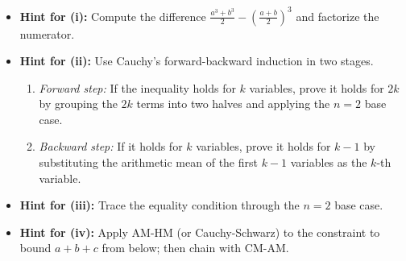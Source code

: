 \begin{hint}
\begin{itemize}[leftmargin=*]
    \item \textbf{Hint for (i):} Compute the difference $\frac{a^3+b^3}{2} - \left(\frac{a+b}{2}\right)^3$ and factorize the numerator.
    \item \textbf{Hint for (ii):} Use Cauchy's forward-backward induction in two stages.
    \begin{enumerate}[leftmargin=*]
        \item \textit{Forward step:} If the inequality holds for $k$ variables, prove it holds for $2k$ by grouping the $2k$ terms into two halves and applying the $n=2$ base case.
        \item \textit{Backward step:} If it holds for $k$ variables, prove it holds for $k-1$ by substituting the arithmetic mean of the first $k-1$ variables as the $k$-th variable.
    \end{enumerate}
    \item \textbf{Hint for (iii):} Trace the equality condition through the $n=2$ base case.
    \item \textbf{Hint for (iv):} Apply AM-HM (or Cauchy-Schwarz) to the constraint to bound $a+b+c$ from below; then chain with CM-AM.
\end{itemize}
\end{hint}

